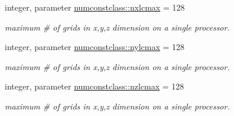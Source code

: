 \begin{DoxyCompactItemize}
\item 
integer, parameter \mbox{\hyperlink{namespacenumconstclass_a8219d90b9dea3ecb8b630e32e3c86026}{numconstclass\+::nxlcmax}} = 128
\begin{DoxyCompactList}\small\item\em maximum \# of grids in x,y,z dimension on a single processor. \end{DoxyCompactList}\item 
integer, parameter \mbox{\hyperlink{namespacenumconstclass_ab087d448ac5f3b93904c966d5790fdf2}{numconstclass\+::nylcmax}} = 128
\begin{DoxyCompactList}\small\item\em maximum \# of grids in x,y,z dimension on a single processor. \end{DoxyCompactList}\item 
integer, parameter \mbox{\hyperlink{namespacenumconstclass_a11dbfc82160f0abca94e67bc7811d3ea}{numconstclass\+::nzlcmax}} = 128
\begin{DoxyCompactList}\small\item\em maximum \# of grids in x,y,z dimension on a single processor. \end{DoxyCompactList}\end{DoxyCompactItemize}

